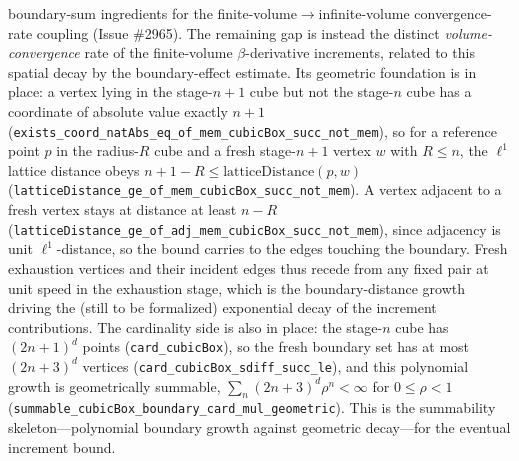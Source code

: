 \documentclass[a4paper,11pt]{article}
\begin{document}
boundary-sum ingredients for the finite-volume\(\to\)infinite-volume
convergence-rate coupling (Issue \#2965).
The remaining gap is instead the distinct \emph{volume-convergence} rate of the
finite-volume \(\beta\)-derivative increments, related to this spatial decay by
the boundary-effect estimate.  Its geometric foundation is in place: a vertex lying in the stage-\(n+1\) cube but not the
stage-\(n\) cube has a coordinate of absolute value exactly \(n+1\)
(\texttt{exists\_coord\_natAbs\_eq\_of\_mem\_cubicBox\_succ\_not\_mem}), so for a
reference point \(p\) in the radius-\(R\) cube and a fresh stage-\(n+1\) vertex
\(w\) with \(R\le n\), the \(\ell^1\) lattice distance obeys
\(n+1-R\le\mathrm{latticeDistance}(p,w)\)
(\texttt{latticeDistance\_ge\_of\_mem\_cubicBox\_succ\_not\_mem}).  A vertex adjacent to a fresh vertex stays at distance at least \(n-R\)
(\texttt{latticeDistance\_ge\_of\_adj\_mem\_cubicBox\_succ\_not\_mem}), since
adjacency is unit \(\ell^1\)-distance, so the bound carries to the edges touching
the boundary.  Fresh exhaustion vertices and their incident edges thus recede
from any fixed pair at unit speed in the exhaustion stage, which is the
boundary-distance growth driving the (still to be formalized) exponential decay
of the increment contributions.  The cardinality side is also in place: the
stage-\(n\) cube has \((2n+1)^d\) points (\texttt{card\_cubicBox}), so the fresh
boundary set has at most \((2n+3)^d\) vertices
(\texttt{card\_cubicBox\_sdiff\_succ\_le}), and this polynomial growth is
geometrically summable, \(\sum_n (2n+3)^d\rho^n<\infty\) for \(0\le\rho<1\)
(\texttt{summable\_cubicBox\_boundary\_card\_mul\_geometric}).  This is the
summability skeleton---polynomial boundary growth against geometric decay---for
the eventual increment bound.
\end{document}
